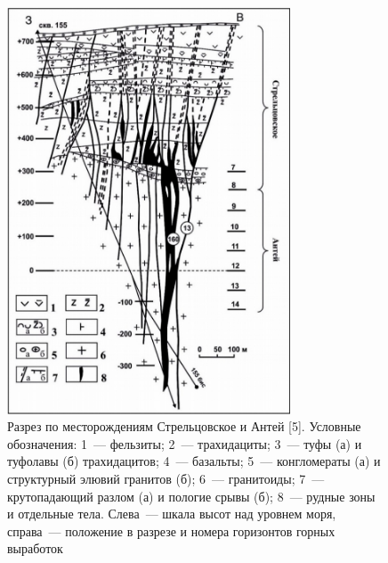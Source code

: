 \begin{figure}[H]
  \begin{center}
    \includegraphics[width=0.75\textwidth]{authors/mandzhieva-fig-2.png}
  \end{center}
  \caption{Разрез по месторождениям Стрельцовское и Антей [5].
Условные обозначения: 1~--- фельзиты; 2~--- трахидациты; 3~--- туфы (а) и туфолавы (б) трахидацитов; 4~--- базальты; 5~--- конгломераты (а) и структурный элювий гранитов (б); 6~--- гранитоиды; 7~--- крутопадающий разлом (а) и пологие срывы (б); 8~--- рудные зоны и отдельные тела. Слева~--- шкала высот над уровнем моря, справа~--- положение в разрезе и номера горизонтов горных выработок}
  \label{fig:mandzhieva-fig2}
\end{figure}

